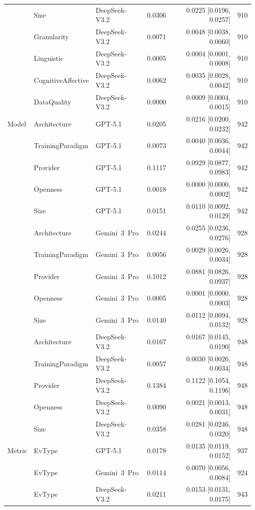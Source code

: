 \begin{tabular}{lllrrl}
 & Size & DeepSeek-V3.2 & 0.0306 & 0.0225 [0.0196, 0.0257] & 910 \\
 & Granularity & DeepSeek-V3.2 & 0.0071 & 0.0048 [0.0038, 0.0060] & 910 \\
 & Linguistic & DeepSeek-V3.2 & 0.0005 & 0.0004 [0.0001, 0.0008] & 910 \\
 & CognitiveAffective & DeepSeek-V3.2 & 0.0062 & 0.0035 [0.0028, 0.0042] & 910 \\
 & DataQuality & DeepSeek-V3.2 & 0.0000 & 0.0009 [0.0004, 0.0015] & 910 \\
Model & Architecture & GPT-5.1 & 0.0205 & 0.0216 [0.0200, 0.0232] & 942 \\
 & TrainingParadigm & GPT-5.1 & 0.0073 & 0.0040 [0.0036, 0.0044] & 942 \\
 & Provider & GPT-5.1 & 0.1117 & 0.0929 [0.0877, 0.0983] & 942 \\
 & Openness & GPT-5.1 & 0.0018 & 0.0000 [0.0000, 0.0002] & 942 \\
 & Size & GPT-5.1 & 0.0151 & 0.0110 [0.0092, 0.0129] & 942 \\
 & Architecture & Gemini~3~Pro & 0.0244 & 0.0255 [0.0236, 0.0276] & 928 \\
 & TrainingParadigm & Gemini~3~Pro & 0.0056 & 0.0029 [0.0026, 0.0034] & 928 \\
 & Provider & Gemini~3~Pro & 0.1012 & 0.0881 [0.0826, 0.0937] & 928 \\
 & Openness & Gemini~3~Pro & 0.0005 & 0.0001 [0.0000, 0.0003] & 928 \\
 & Size & Gemini~3~Pro & 0.0140 & 0.0112 [0.0094, 0.0132] & 928 \\
 & Architecture & DeepSeek-V3.2 & 0.0167 & 0.0167 [0.0145, 0.0190] & 948 \\
 & TrainingParadigm & DeepSeek-V3.2 & 0.0057 & 0.0030 [0.0026, 0.0034] & 948 \\
 & Provider & DeepSeek-V3.2 & 0.1384 & 0.1122 [0.1054, 0.1196] & 948 \\
 & Openness & DeepSeek-V3.2 & 0.0090 & 0.0021 [0.0013, 0.0031] & 948 \\
 & Size & DeepSeek-V3.2 & 0.0358 & 0.0281 [0.0246, 0.0320] & 948 \\
Metric & EvType & GPT-5.1 & 0.0178 & 0.0135 [0.0119, 0.0152] & 937 \\
 & EvType & Gemini~3~Pro & 0.0114 & 0.0070 [0.0056, 0.0084] & 924 \\
 & EvType & DeepSeek-V3.2 & 0.0211 & 0.0153 [0.0131, 0.0175] & 943 \\
\bottomrule
\end{tabular}